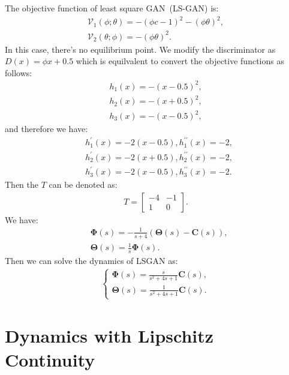 \documentclass{article}
\newcommand{\uV}{\mathcal{V}}
\newcommand{\fC}{\bm{C}}
\newcommand{\fTheta}{\bm{\Theta}}
\newcommand{\fPhi}{\bm{\Phi}}
\theoremstyle{definition}
\begin{document}
The objective function of least square GAN~(LS-GAN) is:
\begin{align}
    \uV_1(\phi; \theta) = - (\phi c - 1)^2 - (\phi\theta)^2, \\
    \uV_2(\theta; \phi) = -(\phi\theta)^2.
\end{align}
In this case, there's no equilibrium point. We modify the discriminator as $D(x) = \phi x + 0.5$ which is equilvalent to convert the objective functions as follows: 
\begin{align}
    h_1(x) = -(x - 0.5)^2, \\
    h_2(x) = -(x + 0.5)^2, \\
    h_3(x) = -(x-0.5)^2,
\end{align}
and therefore we have:
\begin{align}
    &h_1^\prime(x) = -2(x - 0.5), h_1^{\prime\prime}(x) = -2,\\
    &h_2^\prime(x) = -2(x + 0.5), h_2^{\prime\prime}(x) = -2, \\
    &h_3^\prime(x) = -2(x - 0.5), h_3^{\prime\prime}(x) = -2.
\end{align}
Then the $T$ can be denoted as:
\begin{align}
    T = \begin{bmatrix}-4 & -1 \\ 1 & 0 \end{bmatrix}.
\end{align}
We have:
\begin{align}
    &\fPhi(s) = -\frac{1}{s+4}(\fTheta(s) - \fC(s)), \\
    &\fTheta(s) = \frac{1}{s}\fPhi(s).
\end{align}
Then we can solve the dynamics of LSGAN as:
\begin{align}
\begin{cases}
\fPhi(s) = \frac{s}{s^2 + 4s + 1}\fC(s), \\
\fTheta(s) = \frac{1}{s^2 + 4s + 1}\fC(s).
\end{cases}
\end{align}


\section{Dynamics with Lipschitz Continuity}
\end{document}
